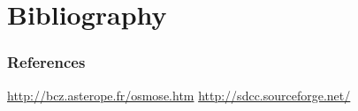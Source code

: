 \documentclass[xcolor=table]{beamer}
\begin{document}
\section{Bibliography}
\begin{frame}
    \frametitle{References}
    \begin{thebibliography}{9}
             \url{http://bcz.asterope.fr/osmose.htm}
             \url{http://sdcc.sourceforge.net/}
    \end{thebibliography}
\end{frame}
\end{document}
